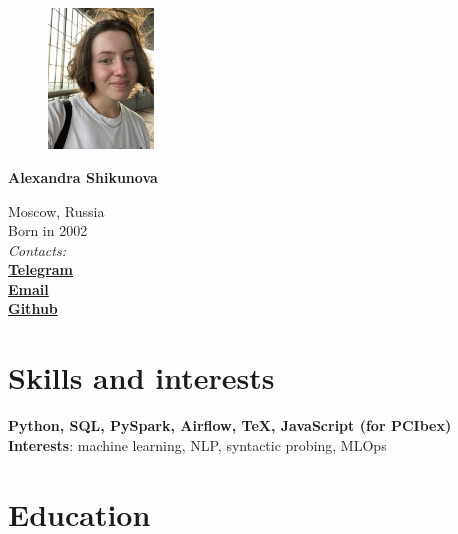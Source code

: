 \documentclass[11pt]{article} %
\begin{document}

\begin{figure} %
    \centering
    \includegraphics[width=0.25\textwidth]{photo}
\end{figure}
{\LARGE\bfseries Alexandra Shikunova} %
\bigskip\bigskip\medskip %

Moscow, Russia\\
Born in 2002\\

\textit{Contacts:}\\
\textbf{\href{https://t.me/thnlgrlivrlvdwsbrnwthrssnhrys}{Telegram}}\\
\textbf{\href{mailto:notalexandrashikunova@gmail.com}{Email}}\\
\textbf{\href{https://github.com/poisongrapevine}{Github}}
\medskip %


\section*{Skills and interests}

\textbf{Python, SQL, PySpark, Airflow, TeX, JavaScript (for PCIbex)}\\
\textbf{Interests}: machine learning, NLP, syntactic probing, MLOps


\section*{Education}
\end{document}
